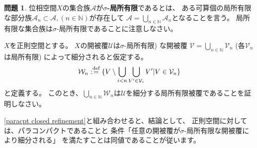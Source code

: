 \documentclass[uplatex]{jsarticle}
\theoremstyle{definition}
\newtheorem{prob}[prob]{問題}
\newcommand{\dfn}{:\overset{\mbox{{\scriptsize def}}}{=}}
\newcommand{\N}{\mathbb{N}}
\newcommand{\mcA}{\mathcal{A}}
\newcommand{\mcU}{\mathcal{U}}
\newcommand{\mcV}{\mathcal{V}}
\newcommand{\mcW}{\mathcal{W}}
\begin{document}
\begin{prob}
  位相空間\(X\)の集合族\(\mcA\)が\textbf{\(\sigma\)-局所有限}であるとは、
  ある可算個の局所有限な部分族\(\mcA_n\subset \mcA,(n\in \N)\)が存在して
  \(\mcA = \bigcup_{n\in \N}\mcA_n\)となることを言う。
  局所有限な集合族は\(\sigma\)-局所有限であることに注意しなさい。

  \(X\)を正則空間とする。
  \(X\)の開被覆\(\mcU\)は\(\sigma\)-局所有限) な開被覆
  \(\mcV = \bigcup_{n\in \N}\mcV_n\) (各\(\mcV_n\)は局所有限)
  によって細分されると仮定する。
  \[
  \mcW_n \dfn \{ V \setminus \bigcup_{i < n}\bigcup_{V'\in \mcV_i} V' | V\in \mcV_n \}
  \]
  と定義する。
  このとき、\(\bigcup_{n\in \N}\mcW_n\)は\(\mcU\)を細分する局所有限被覆であることを証明しなさい。

  \autoref{paracpt closed refinement}と組み合わせると、結論として、
  正則空間に対しては、パラコンパクトであることと
  条件「任意の開被覆が\(\sigma\)-局所有限な開被覆により細分される」
  を満たすことは同値であることが従います。
\end{prob}
\end{document}
